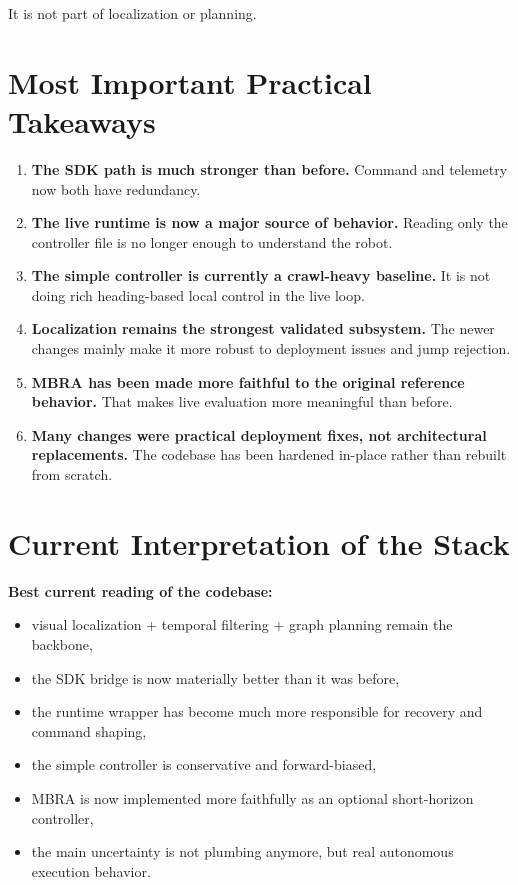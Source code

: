 \documentclass[11pt,a4paper]{article}
\begin{document}
It is not part of localization or planning.


\section{Most Important Practical Takeaways}

\begin{enumerate}[nosep]
  \item \textbf{The SDK path is much stronger than before.}
  Command and telemetry now both have redundancy.

  \item \textbf{The live runtime is now a major source of behavior.}
  Reading only the controller file is no longer enough to understand the robot.

  \item \textbf{The simple controller is currently a crawl-heavy baseline.}
  It is not doing rich heading-based local control in the live loop.

  \item \textbf{Localization remains the strongest validated subsystem.}
  The newer changes mainly make it more robust to deployment issues and jump rejection.

  \item \textbf{MBRA has been made more faithful to the original reference behavior.}
  That makes live evaluation more meaningful than before.

  \item \textbf{Many changes were practical deployment fixes, not architectural replacements.}
  The codebase has been hardened in-place rather than rebuilt from scratch.
\end{enumerate}


\section{Current Interpretation of the Stack}

\begin{mdframed}
\textbf{Best current reading of the codebase:}

\begin{itemize}[nosep]
  \item visual localization + temporal filtering + graph planning remain the backbone,
  \item the SDK bridge is now materially better than it was before,
  \item the runtime wrapper has become much more responsible for recovery and command shaping,
  \item the simple controller is conservative and forward-biased,
  \item MBRA is now implemented more faithfully as an optional short-horizon controller,
  \item the main uncertainty is not plumbing anymore, but real autonomous execution behavior.
\end{itemize}
\end{mdframed}
\end{document}
